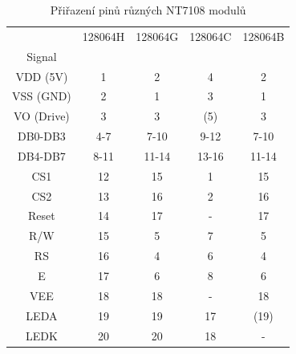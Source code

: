 \begin{table}[H]
  \begin{center}
    \begin{tabular}{| c || c | c | c | c |}
    \hline
           & 128064H  &  128064G  & 128064C  & 128064B \\
    Signal &         &          &         &         \\
    \hline
    \hline
  VDD (5V) &   1     &  2       &   4     & 2       \\
    \hline
  VSS (GND) &   2     &  1       &   3     & 1       \\
    \hline
 VO (Drive) &   3     &  3       &  (5)    & 3       \\
    \hline
  DB0-DB3   &   4-7   &  7-10    &   9-12  & 7-10    \\
    \hline
  DB4-DB7   &   8-11  &  11-14   &   13-16 & 11-14   \\
    \hline
  CS1       &   12    &  15      &   1     & 15      \\
  CS2       &   13    &  16      &   2     & 16      \\
    \hline
  Reset     &   14    &  17      &   -     & 17      \\
    \hline
  R/W       &   15    &  5       &   7     & 5       \\
    \hline
  RS        &   16    &  4       &   6     & 4       \\
    \hline
  E         &   17    &  6       &   8     & 6       \\
    \hline
  VEE       &   18    &  18      &   -     & 18      \\
    \hline
  LEDA      &   19    &  19      &   17    & (19)      \\
  LEDK      &   20    &  20      &   18    & -      \\
    \hline
    \end{tabular}
  \end{center}
  \caption{Přiřazení pinů různých NT7108 modulů}
  \label{tab:NT7108types}
\end{table}

